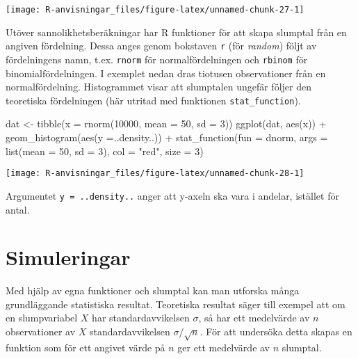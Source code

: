 \documentclass[
]{book}
\newenvironment{Shaded}{\begin{snugshade}}{\end{snugshade}}
\newcommand{\AttributeTok}[1]{\textcolor[rgb]{0.77,0.63,0.00}{#1}}
\newcommand{\DecValTok}[1]{\textcolor[rgb]{0.00,0.00,0.81}{#1}}
\newcommand{\FunctionTok}[1]{\textcolor[rgb]{0.00,0.00,0.00}{#1}}
\newcommand{\NormalTok}[1]{#1}
\newcommand{\OtherTok}[1]{\textcolor[rgb]{0.56,0.35,0.01}{#1}}
\newcommand{\SpecialCharTok}[1]{\textcolor[rgb]{0.00,0.00,0.00}{#1}}
\newcommand{\StringTok}[1]{\textcolor[rgb]{0.31,0.60,0.02}{#1}}
\theoremstyle{definition}
\theoremstyle{definition}
\theoremstyle{definition}
\theoremstyle{definition}
\theoremstyle{remark}
\begin{document}
\begin{center}\texttt{[image: R-anvisningar\_files/figure-latex/unnamed-chunk-27-1]} \end{center}

Utöver sannolikhetsberäkningar har R funktioner för att skapa slumptal från en angiven fördelning. Dessa anges genom bokstaven \texttt{r} (för \emph{random}) följt av fördelningens namn, t.ex. \texttt{rnorm} för normalfördelningen och \texttt{rbinom} för binomialfördelningen. I exemplet nedan dras tiotusen observationer från en normalfördelning. Histogrammet visar att slumptalen ungefär följer den teoretiska fördelningen (här utritad med funktionen \texttt{stat\_function}).

\begin{Shaded}
\begin{Highlighting}[]
\NormalTok{dat }\OtherTok{\textless{}{-}} \FunctionTok{tibble}\NormalTok{(}\AttributeTok{x =} \FunctionTok{rnorm}\NormalTok{(}\DecValTok{10000}\NormalTok{, }\AttributeTok{mean =} \DecValTok{50}\NormalTok{, }\AttributeTok{sd =} \DecValTok{3}\NormalTok{))}
\FunctionTok{ggplot}\NormalTok{(dat, }\FunctionTok{aes}\NormalTok{(x)) }\SpecialCharTok{+}
  \FunctionTok{geom\_histogram}\NormalTok{(}\FunctionTok{aes}\NormalTok{(}\AttributeTok{y =}\NormalTok{..density..)) }\SpecialCharTok{+}
  \FunctionTok{stat\_function}\NormalTok{(}\AttributeTok{fun =}\NormalTok{ dnorm, }\AttributeTok{args =} \FunctionTok{list}\NormalTok{(}\AttributeTok{mean =} \DecValTok{50}\NormalTok{, }\AttributeTok{sd =} \DecValTok{3}\NormalTok{), }
                \AttributeTok{col =} \StringTok{"red"}\NormalTok{, }\AttributeTok{size =} \DecValTok{3}\NormalTok{)}
\end{Highlighting}
\end{Shaded}

\begin{center}\texttt{[image: R-anvisningar\_files/figure-latex/unnamed-chunk-28-1]} \end{center}

Argumentet \texttt{y\ =\ ..density..} anger att y-axeln ska vara i andelar, istället för antal.

\hypertarget{simuleringar}{%
\section{Simuleringar}\label{simuleringar}}

Med hjälp av egna funktioner och slumptal kan man utforska många grundläggande statistiska resultat. Teoretiska resultat säger till exempel att om en slumpvariabel \(X\) har standardavvikelsen \(\sigma\), så har ett medelvärde av \(n\) observationer av \(X\) standardavvikelsen \(\sigma / \sqrt n\). För att undersöka detta skapas en funktion som för ett angivet värde på \(n\) ger ett medelvärde av \(n\) slumptal.
\end{document}
